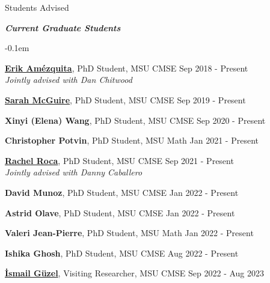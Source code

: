 \documentclass{resume} %
\begin{document}
\begin{rSection}{Students Advised}


\textbf{\textit{Current Graduate Students}}
\begin{list}{}{\leftmargin=1em}
   \itemsep -0.1em %






   \item \textbf{\href{https://www.egr.msu.edu/~amezqui3/aboutme.html}{Erik Am\'ezquita}}, PhD Student, MSU CMSE \hfill Sep 2018 - Present
\\
   \phantom{XXX} \textit{Jointly advised with Dan Chitwood}
   \item \textbf{\href{https://www.egr.msu.edu/~mcgui176/}{Sarah McGuire}}, PhD Student, MSU CMSE \hfill Sep 2019 - Present


   \item \textbf{Xinyi (Elena) Wang}, PhD Student, MSU CMSE \hfill Sep 2020 - Present

   \item \textbf{Christopher Potvin}, PhD Student, MSU Math \hfill Jan 2021 - Present

   \item \textbf{\href{https://sites.google.com/manhattan.edu/racheleroca/home}{Rachel Roca}}, PhD Student, MSU CMSE \hfill Sep 2021 - Present
\\
   \phantom{XXX} \textit{Jointly advised with Danny Caballero}


   \item \textbf{David Munoz}, PhD Student, MSU CMSE \hfill Jan 2022 - Present
   

   \item \textbf{Astrid Olave}, PhD Student, MSU CMSE \hfill Jan 2022 - Present
   

   \item \textbf{Valeri Jean-Pierre}, PhD Student, MSU Math \hfill Jan 2022 - Present
   
   \item \textbf{Ishika Ghosh}, PhD Student, MSU CMSE \hfill Aug 2022 - Present
   


   \item \textbf{\href{https://ismailguzel.github.io/}{\.{I}smail G\"{u}zel}}, Visiting Researcher, MSU CMSE \hfill Sep 2022 - Aug 2023


\end{list}



\end{rSection}
\end{document}
